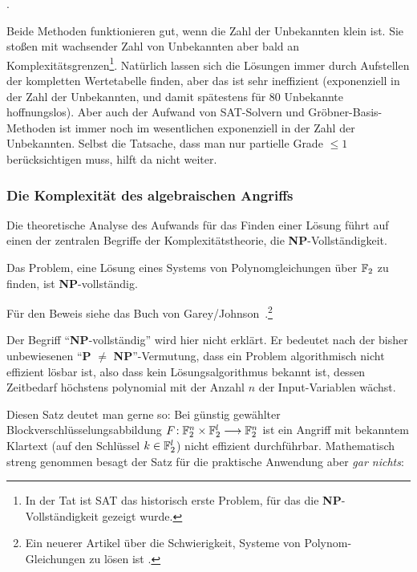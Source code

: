 \begin{refsegment}
\begin{itemize}
{      }.
\end{itemize}
Beide Methoden funktionieren gut, wenn die Zahl der Unbekannten klein
ist. Sie stoßen mit wachsender Zahl von Unbekannten aber bald an
Komplexitätsgrenzen\footnote{%
  In der Tat ist SAT das historisch erste Problem, für das die
  {\bf NP}-Vollständigkeit gezeigt wurde.
}.
Natürlich lassen sich die Lösungen immer durch Aufstellen der kompletten
Wertetabelle finden, aber das ist sehr ineffizient (exponenziell
in der Zahl der Unbekannten, und damit spätestens für 80 Unbekannte hoffnungslos).
Aber auch der Aufwand von SAT-Solvern und Gröbner-Basis-Methoden ist
immer noch im wesentlichen exponenziell in der Zahl der Unbekannten.
Selbst die Tatsache, dass man nur partielle Grade
$\leq 1$ berücksichtigen muss, hilft da nicht weiter.

\subsubsection*{Die Komplexität des algebraischen Angriffs}

Die theoretische Analyse des Aufwands für das Finden einer Lösung führt
auf einen der zentralen Begriffe der Komplexitätstheorie, die
{\bf NP}-Vollständigkeit.

\begin{satz}
  Das Problem, eine Lösung eines Systems von Polynomgleichungen über $\mathbb{F}_2$
  zu finden, ist {\bf NP}-vollständig.
\end{satz}
Für den Beweis siehe das Buch von Garey/Johnson~\cite{GaJo1979}.\footnote{%
   Ein neuerer Artikel über die Schwierigkeit, Systeme von Polynom-Gleichungen zu lösen
   ist \cite{CGHM2003}.
}

Der Begriff "`{\bf NP}-vollständig"' wird hier nicht erklärt.
Er bedeutet nach der bisher unbewiesenen "`{\bf P} $\neq$ {\bf NP}"'-Vermutung,
dass ein Problem algorithmisch nicht effizient lösbar ist, also dass kein
Lösungsalgorithmus bekannt ist, dessen Zeitbedarf höchstens polynomial
mit der Anzahl $n$ der Input-Variablen wächst.

Diesen Satz deutet man gerne so: Bei günstig gewählter Blockverschlüsselungsabbildung
\mbox{$F\!: \mathbb{F}_2^n \times \mathbb{F}_2^l \longrightarrow \mathbb{F}_2^n$} ist ein Angriff mit
bekanntem Klartext
(auf den Schlüssel $k \in \mathbb{F}_2^l$) nicht effizient durchführbar. Mathematisch streng
genommen besagt der Satz für die praktische Anwendung aber {\em gar nichts}:


\end{refsegment}
